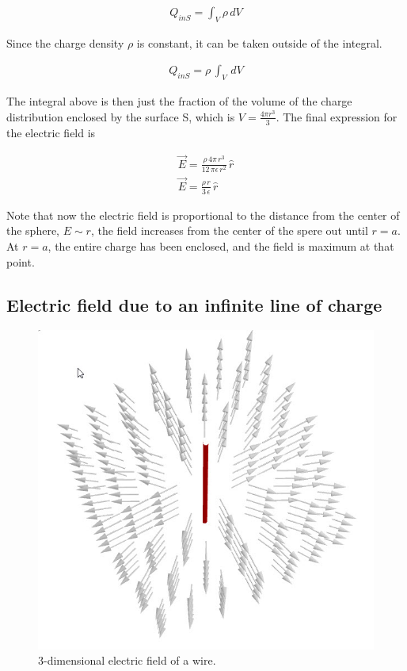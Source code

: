 \documentclass{ximera}
\begin{document}
\begin{eqnarray}
Q_{inS}=\int_V \rho \, dV
\end{eqnarray}

Since the charge density $\rho$ is constant, it can be taken outside of the integral.


\begin{eqnarray}
Q_{inS}=\rho \, \int_V \, dV
\end{eqnarray}

The integral above is then just the fraction of the volume of the charge distribution enclosed by the surface S, which is $V=\frac{4 \pi r^3}{3}$. The final expression for the electric field is 


\begin{eqnarray}
 \vec{E}  = \frac{\rho \, 4 \pi \, r^3}{12 \, \pi  \epsilon \, r^2} \, \hat{r} \\
 \vec{E}  = \frac{\rho \, r}{3  \, \epsilon } \, \hat{r}
\end{eqnarray}

Note that now the electric field is proportional to the distance from the center of the sphere, $E\sim r$, the field increases from the center of the spere out until $r=a$. At $r=a$, the entire charge has been enclosed, and the field is maximum at that point.

\subsection{Electric field due to an infinite line of charge}


\begin{figure}[htbp]
\begin{center}
\includegraphics[scale=0.5]{../jpg/infiniteLineChargeField3D.jpg}
\end{center}
\caption{3-dimensional electric field of a wire.}
\label{GausLine}
\end{figure}
\end{document}
